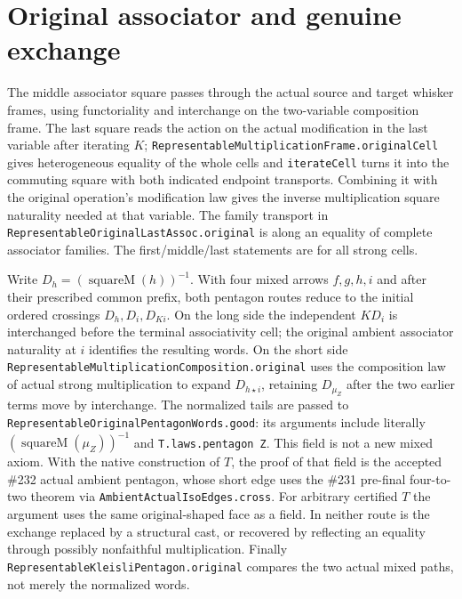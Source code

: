 \documentclass[11pt]{article}
\newcommand{\nm}[1]{\nolinkurl{#1}}
\begin{document}
\section*{Original associator and genuine exchange}
The middle associator square passes through the actual source and
target whisker frames, using functoriality and interchange on the
two-variable composition frame. The last square reads the action on
the actual modification in the last variable after iterating $K$;
\nm{RepresentableMultiplicationFrame.originalCell} gives heterogeneous
equality of the whole cells and \nm{iterateCell} turns it into the
commuting square with both indicated endpoint transports. Combining it with
the original operation's modification law gives the inverse
multiplication square naturality needed at that variable. The family
transport in \nm{RepresentableOriginalLastAssoc.original} is along
an equality of complete associator families. The first/middle/last
statements are for all strong cells.
 
Write $D_h=(\operatorname{squareM}(h))^{-1}$. With four mixed arrows
$f,g,h,i$ and after their prescribed common prefix, both pentagon
routes reduce to the initial ordered crossings $D_h,D_i,D_{Ki}$.
On the long side the independent $K D_i$ is interchanged before the
terminal associativity cell; the original ambient associator
naturality at $i$ identifies the resulting words. On the short side
\nm{RepresentableMultiplicationComposition.original} uses the
composition law of actual strong multiplication to expand
$D_{h\star i}$, retaining $D_{\mu_Z}$ after the two earlier terms
move by interchange. The normalized tails are passed to
\nm{RepresentableOriginalPentagonWords.good}: its arguments include
literally $(\operatorname{squareM}(\mu_Z))^{-1}$ and
\nm{T.laws.pentagon Z}. This field is not a new mixed axiom. With
the native construction of $T$, the proof of that field is the
accepted \#232 actual ambient pentagon, whose short edge uses the
\#231 pre-final four-to-two theorem via
\nm{AmbientActualIsoEdges.cross}. For arbitrary certified $T$ the
argument uses the same original-shaped face as a field. In neither
route is the exchange replaced by a structural cast, or recovered
by reflecting an equality through possibly nonfaithful multiplication.
Finally \nm{RepresentableKleisliPentagon.original} compares the two
actual mixed paths, not merely the normalized words.
 
\end{document}

